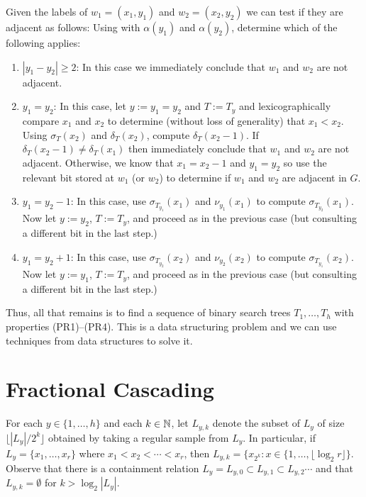 \documentclass[kpfonts]{patmorin}
\begin{document}
Given the labels of $w_1=(x_1,y_1)$ and $w_2=(x_2,y_2)$ we can test if they are adjacent as follows: Using  with $\alpha(y_1)$ and $\alpha(y_2)$, determine which of the following applies:
\begin{enumerate}
  \item $|y_1-y_2|\ge 2$: In this case we immediately conclude that $w_1$ and $w_2$ are not adjacent.  
  
  \item $y_1=y_2$: In this case, let $y:=y_1=y_2$ and $T:=T_y$ and lexicographically compare $x_1$ and $x_2$ to determine (without loss of generality) that $x_1<x_2$.  Using $\sigma_{T}(x_2)$ and $\delta_{T}(x_2)$, compute $\delta_{T}(x_2-1)$.  If $\delta_{T}(x_2-1)\neq \delta_T(x_1)$ then immediately conclude that $w_1$ and $w_2$ are not adjacent.  Otherwise, we know that $x_1=x_2-1$ and $y_1=y_2$ so use the relevant bit stored at $w_1$ (or $w_2$) to determine if $w_1$ and $w_2$ are adjacent in $G$.
  
  \item $y_1=y_2-1$: In this case, use $\sigma_{T_{y_1}}(x_1)$ and $\nu_{y_1}(x_1)$ to compute $\sigma_{T_{y_2}}(x_1)$.  Now let $y:=y_2$, $T:=T_{y}$, and proceed as in the previous case (but consulting a different bit in the last step.)
  
  \item $y_1=y_2+1$: In this case, use $\sigma_{T_{y_2}}(x_2)$ and $\nu_{y_2}(x_2)$ to compute $\sigma_{T_{y_1}}(x_2)$.  Now let $y:=y_1$, $T:=T_{y}$, and proceed as in the previous case (but consulting a different bit in the last step.)
\end{enumerate}

Thus, all that remains is to find a sequence of binary search trees $T_1,\ldots,T_h$ with properties (PR1)--(PR4). This is a data structuring problem and we can use techniques from data structures to solve it.

\section{Fractional Cascading}

For each $y\in\{1,\ldots,h\}$ and each $k\in\mathbb{N}$, let $L_{y,k}$ denote the subset of $L_{y}$ of size $\lfloor|L_{y}|/2^k\rfloor$ obtained by taking a regular sample from $L_y$.  In particular, if $L_y=\{x_1,\ldots,x_r\}$ where $x_1<x_2<\cdots<x_r$, then $L_{y,k}=\{x_{2^k}:x\in\{1,\ldots,\lfloor\log_2 r\rfloor\}$.  Observe that there is a containment relation $L_y=L_{y,0}\subset L_{y,1}\subset L_{y,2} \cdots$ and that $L_{y,k}=\emptyset$ for $k>\log_2|L_y|$.
\end{document}

